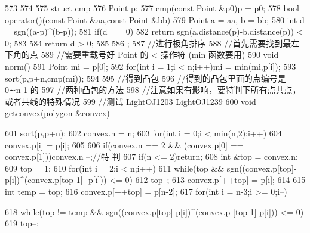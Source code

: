 \documentclass[11pt]{article}
\begin{document}
\begin{Code}
{{{573           }
574       }
575       struct cmp{
576           Point p;
577           cmp(const Point &p0){p = p0;}
578           bool operator()(const Point &aa,const Point &bb){
579               Point a = aa, b = bb;
580               int d = sgn((a-p)^(b-p));
581               if(d == 0){
582                    return sgn(a.distance(p)-b.distance(p)) < 0;
583               }
584               return d > 0;
585           }
586       };
587       //进行极角排序
588       //首先需要找到最左下角的点
589       //需要重载号好 Point 的 < 操作符 (min 函数要用)
590       void norm(){
591           Point mi = p[0];
592           for(int i = 1;i < n;i++)mi = min(mi,p[i]);
593           sort(p,p+n,cmp(mi));
594       }
595       //得到凸包
596       //得到的凸包里面的点编号是 0∼n-1 的
597       //两种凸包的方法
598       //注意如果有影响，要特判下所有点共点，或者共线的特殊情况
599       //测试 LightOJ1203 LightOJ1239
600       void getconvex(polygon &convex){
601           sort(p,p+n);
602           convex.n = n;
603           for(int i = 0;i < min(n,2);i++){
604               convex.p[i] = p[i];
605           }
606           if(convex.n == 2 && (convex.p[0] == convex.p[1]))convex.n
                 --;//特
                 判
607           if(n <= 2)return;
608           int &top = convex.n;
609           top = 1;
610           for(int i = 2;i < n;i++){
611               while(top && sgn((convex.p[top]-p[i])^(convex.p[top-1]-
                     p[i])) <= 0)
612                    top--;
613               convex.p[++top] = p[i];
614           }
615           int temp = top;
616           convex.p[++top] = p[n-2];
617           for(int i = n-3;i >= 0;i--){
618               while(top != temp && sgn((convex.p[top]-p[i])^(convex.p
                     [top-1]-p[i])) <= 0)
619                    top--;


}}}
\end{Code}
\end{document}
